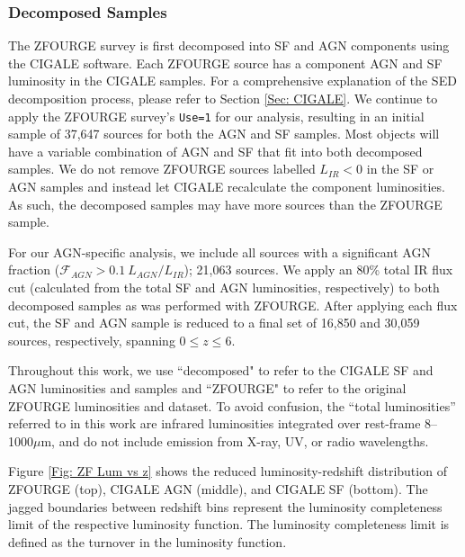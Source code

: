\subsubsection{Decomposed Samples} \label{Sec: Decomposed AGN Selection}
The ZFOURGE survey is first decomposed into SF and AGN components using the CIGALE software. Each ZFOURGE source has a component AGN and SF luminosity in the CIGALE samples. For a comprehensive explanation of the SED decomposition process, please refer to Section \ref{Sec: CIGALE}. We continue to apply the ZFOURGE survey's \texttt{Use=1} for our analysis, resulting in an initial sample of 37,647 sources for both the AGN and SF samples. Most objects will have a variable combination of AGN and SF that fit into both decomposed samples. We do not remove ZFOURGE sources labelled $L_{IR}<0$ in the SF or AGN samples and instead let CIGALE recalculate the component luminosities. As such, the decomposed samples may have more sources than the ZFOURGE sample. 

For our AGN-specific analysis, we include all sources with a significant AGN fraction ($\mathcal{F}_{AGN}>0.1\ L_{AGN}/L_{IR}$); 21,063 sources. We apply an 80\% total IR flux cut (calculated from the total SF and AGN luminosities, respectively) to both decomposed samples as was performed with ZFOURGE. After applying each flux cut, the SF and AGN sample is reduced to a final set of 16,850 and 30,059 sources, respectively, spanning $0 \leq z \leq 6$. 

Throughout this work, we use ``decomposed" to refer to the CIGALE SF and AGN luminosities and samples and ``ZFOURGE" to refer to the original ZFOURGE luminosities and dataset. To avoid confusion, the ``total luminosities” referred to in this work are infrared luminosities integrated over rest-frame 8–1000$\mu$m, and do not include emission from X-ray, UV, or radio wavelengths.

Figure \ref{Fig: ZF Lum vs z} shows the reduced luminosity-redshift distribution of ZFOURGE (top), CIGALE AGN (middle), and CIGALE SF (bottom). The jagged boundaries between redshift bins represent the luminosity completeness limit of the respective luminosity function. The luminosity completeness limit is defined as the turnover in the luminosity function.

